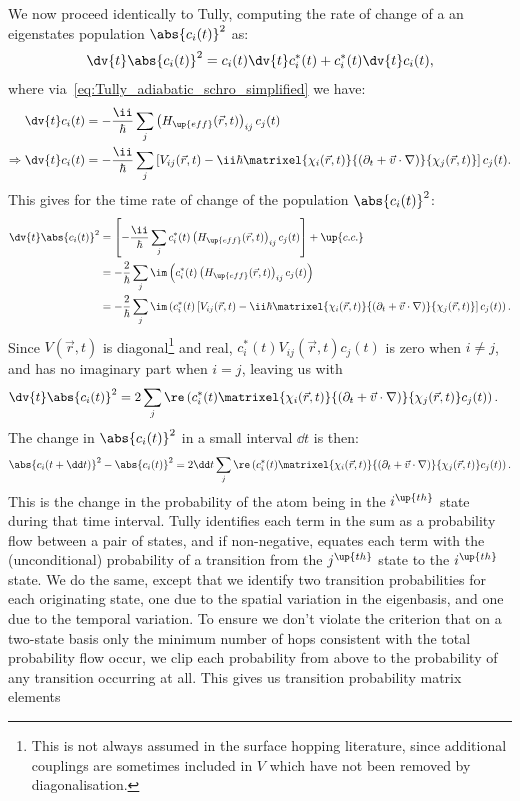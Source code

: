 We now proceed identically to Tully, computing the rate of change of a an eigenstates population $\abs{c_i(t)}^2$ as:
\begin{align}
\dv{t}\abs{c_i(t)}^2 = c_i(t) \dv{t}c_i^*(t) + c_i^*(t) \dv{t}c_i(t),
\end{align}
where via~\eqref{eq:Tully_adiabatic_schro_simplified} we have:
\begin{align}
\dv{t}c_i(t) &= -\frac\ii\hbar\sum_j \left(H_\up{eff}(\vec r, t)\right)_{ij} c_j(t)\\
\Rightarrow \dv{t}c_i(t) &= -\frac\ii\hbar \sum_j\left[V_{ij}(\vec r, t)
  - \ii\hbar\matrixel{\chi_i(\vec r, t)}{(\partial_t + \vec v\cdot\nabla)}{\chi_j(\vec r, t)}
 \right] c_j(t).
\end{align}
This gives for the time rate of change of the population $\abs{c_i(t)}^2$:
\begin{align}
\dv{t}\abs{c_i(t)}^2 &= \left[-\frac\ii\hbar \sum_j c_i^*(t) \left(H_\up{eff}(\vec r, t)\right)_{ij} c_j(t)\right] + \up{c.c.}\\
&= -\frac2\hbar\sum_j\im\left(c_i^*(t) \left(H_\up{eff}(\vec r, t)\right)_{ij} c_j(t)\right)\label{eq:fewest_switches_Heff}\\
&= -\frac2\hbar\sum_j\im\left(c_i^*(t)
\left[V_{ij}(\vec r, t)
  - \ii\hbar\matrixel{\chi_i(\vec r, t)}{(\partial_t + \vec v\cdot\nabla)}{\chi_j(\vec r, t)}
 \right]
 c_j(t)\right).
\end{align}
Since $V(\vec r, t)$ is diagonal\footnote{This is not always assumed in the surface hopping literature, since additional couplings are sometimes included in $V$ which have not been removed by diagonalisation.} and real, $c_i^*(t)V_{ij}(\vec r, t)c_j(t)$ is zero when $i\neq j$, and has no imaginary part when $i=j$, leaving us with
\begin{align}
\dv{t}\abs{c_i(t)}^2 &= 2\sum_j\re\left(c_i^*(t)
  \matrixel{\chi_i(\vec r, t)}{(\partial_t + \vec v\cdot\nabla)}{\chi_j(\vec r, t)}
 c_j(t)\right).
\end{align}
The change in $\abs{c_i(t)}^2$ in a small interval $\dd t$ is then:
\begin{align}\label{eq:Tully_change_in_prob}
\abs{c_i(t + \dd t)}^2 - \abs{c_i(t)}^2 = 2\dd t
\sum_j\re\left(c_i^*(t)
  \matrixel{\chi_i(\vec r, t)}{(\partial_t + \vec v\cdot\nabla)}{\chi_j(\vec r, t)}
 c_j(t)\right).
\end{align}
This is the change in the probability of the atom being in the $i^\up{th}$ state during that time interval. Tully identifies each term in the sum as a probability flow between a pair of states, and if non-negative, equates each term with the (unconditional) probability of a transition from the $j^\up{th}$ state to the $i^\up{th}$ state. We do the same, except that we identify two transition probabilities for each originating state, one due to the spatial variation in the eigenbasis, and one due to the temporal variation. To ensure we don't violate the criterion that on a two-state basis only the minimum number of hops consistent with the total probability flow occur, we clip each probability from above to the probability of any transition occurring at all. This gives us transition probability matrix elements

